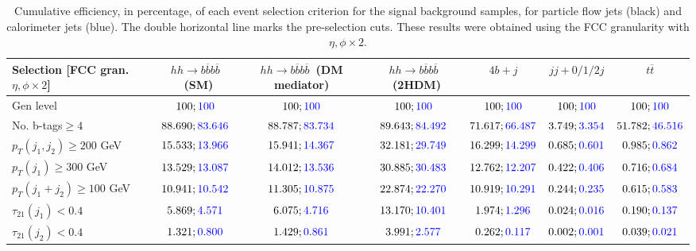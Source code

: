 \begin{landscape}
		\begin{table}
			\centering
			\caption{Cumulative efficiency, in percentage, of each event selection criterion for the signal background samples, for particle flow jets (black) and calorimeter jets (blue). The double horizontal line marks the pre-selection cuts. These results were obtained using the FCC granularity with $\eta,\phi\times 2$.}
			\begin{tabular}{lcccccc}
				\toprule 
				\textbf{Selection [FCC gran. $\eta,\phi\times 2$]} & $hh\rightarrow b\overline{b}b\overline{b}$~(SM) & $hh\rightarrow b\overline{b}b\overline{b}$~(DM mediator) & $hh\rightarrow b\overline{b}b\overline{b}$~(2HDM) & $4b+j$  & $jj+0/1/2 j$ & $t\overline{t}$ \\
				\midrule
				Gen level & $100;\textcolor{blue}{100}$ & $100;\textcolor{blue}{100}$ &$100;\textcolor{blue}{100}$& $100;\textcolor{blue}{100}$& $100;\textcolor{blue}{100}$& $100;\textcolor{blue}{100}$ \\
				\rowcolor{black!7}No. b-tags$\geq 4$&$88.690;\textcolor{blue}{83.646}$&$88.787;\textcolor{blue}{83.734}$&$89.643;\textcolor{blue}{84.492}$&$71.617;\textcolor{blue}{66.487}$&$3.749;\textcolor{blue}{3.354}$&$51.782;\textcolor{blue}{46.516}$\\
				$p_T(j_1,j_2)\geq200$ GeV & $15.533;\textcolor{blue}{13.966}$ & $15.941;\textcolor{blue}{14.367}$&$32.181;\textcolor{blue}{29.749}$ &$16.299;\textcolor{blue}{14.299}$&$0.685;\textcolor{blue}{0.601}$&$0.985;\textcolor{blue}{0.862}$\\ 
				\midrule \midrule
				\rowcolor{black!7}$p_T(j_1)\geq 300$ GeV & $13.529;\textcolor{blue}{13.087}$ &$14.012;\textcolor{blue}{13.536}$  &$30.885;\textcolor{blue}{30.483}$&$12.762;\textcolor{blue}{12.207}$&$0.422;\textcolor{blue}{0.406}$&$0.716;\textcolor{blue}{0.684}$\\ 
				$p_T(j_1+j_2)\geq 100$ GeV &$10.941;\textcolor{blue}{10.542}$ & $11.305;\textcolor{blue}{10.875}$ &$22.874;\textcolor{blue}{22.270}$&$10.919;\textcolor{blue}{10.291}$&$0.244;\textcolor{blue}{0.235}$&$0.615;\textcolor{blue}{0.583}$\\
				\rowcolor{black!7}$\tau_{21}(j_1)<0.4$ & $5.869;\textcolor{blue}{4.571}$& $6.075;\textcolor{blue}{4.716}$&$13.170;\textcolor{blue}{10.401}$&$1.974;\textcolor{blue}{1.296}$&$0.024;\textcolor{blue}{0.016}$&$0.190;\textcolor{blue}{0.137}$\\
				$\tau_{21}(j_2)<0.4$ &$1.321;\textcolor{blue}{0.800}$ &$1.429;\textcolor{blue}{0.861}$ &$3.991;\textcolor{blue}{2.577}$&$0.262;\textcolor{blue}{0.117}$&$0.002;\textcolor{blue}{0.001}$&$0.039;\textcolor{blue}{0.021}$\\

\end{tabular}
\end{table}
\end{landscape}
